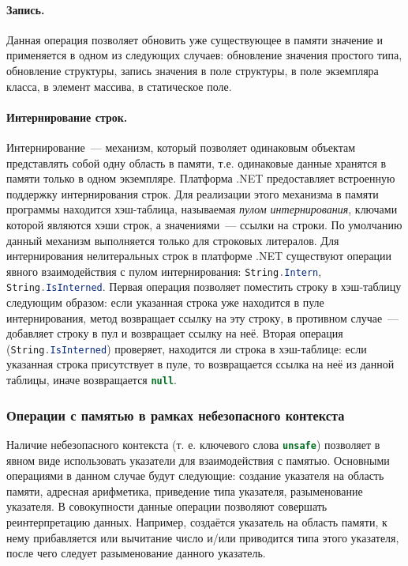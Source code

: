 \paragraph{Запись.} Данная операция позволяет обновить уже существующее в памяти значение и применяется в одном из следующих случаев: обновление значения простого типа, обновление структуры, запись значения в поле структуры, в поле экземпляра класса, в элемент массива, в статическое поле.

\paragraph{Интернирование строк.} Интернирование~--- механизм, который позволяет одинаковым объектам представлять собой одну область в памяти, т.е. одинаковые данные хранятся в памяти только в одном экземпляре. Платформа .NET предоставляет встроенную поддержку интернирования строк. Для реализации этого механизма в памяти программы находится хэш-таблица, называемая \emph{пулом интернирования}, ключами которой являются хэши строк, а значениями~--- ссылки на строки. По умолчанию данный механизм выполняется только для строковых литералов. Для интернирования нелитеральных строк в платформе .NET существуют операции явного взаимодействия с пулом интернирования: \lstinline[language=csharp]{String.Intern}, \lstinline[language=csharp]{String.IsInterned}. Первая операция позволяет поместить строку в хэш-таблицу следующим образом: если указанная строка уже находится в пуле интернирования, метод возвращает ссылку на эту строку, в противном случае~--- добавляет строку в пул и возвращает ссылку на неё. Вторая операция (\lstinline[language=csharp]{String.IsInterned}) проверяет, находится ли строка в хэш-таблице: если указанная строка присутствует в пуле, то возвращается ссылка на неё из данной таблицы, иначе возвращается \lstinline[language=csharp]{null}.

\subsubsection{Операции с памятью в рамках небезопасного контекста}

Наличие небезопасного контекста (т. е. ключевого слова \lstinline[language=csharp]{unsafe}) позволяет в явном виде использовать указатели для взаимодействия с памятью. Основными операциями в данном случае будут следующие: создание указателя на область памяти, адресная арифметика, приведение типа указателя, разыменование указателя. В совокупности данные операции позволяют совершать реинтерпретацию данных. Например, создаётся указатель на область памяти, к нему прибавляется или вычитание число и/или приводится типа этого указателя, после чего следует разыменование данного указатель. 

